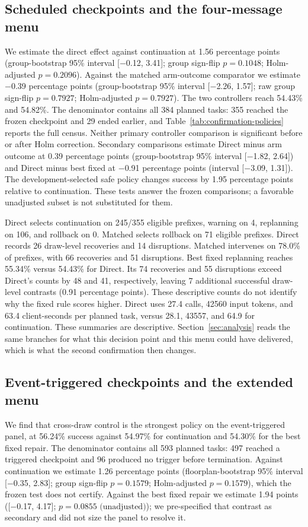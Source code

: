 \subsection{Scheduled checkpoints and the four-message menu}
We estimate the direct effect against continuation at 1.56 percentage points (group-bootstrap 95\% interval [$-$0.12, 3.41]; group sign-flip $p=0.1048$; Holm-adjusted $p=0.2096$). Against the matched arm-outcome comparator we estimate $-$0.39 percentage points (group-bootstrap 95\% interval [$-$2.26, 1.57]; raw group sign-flip $p=0.7927$; Holm-adjusted $p=0.7927$). The two controllers reach 54.43\% and 54.82\%. The denominator contains all 384 planned tasks: 355 reached the frozen checkpoint and 29 ended earlier, and Table~\ref{tab:confirmation-policies} reports the full census. Neither primary controller comparison is significant before or after Holm correction. Secondary comparisons estimate Direct minus arm outcome at 0.39 percentage points (group-bootstrap 95\% interval [$-$1.82, 2.64]) and Direct minus best fixed at $-$0.91 percentage points (interval [$-$3.09, 1.31]). The development-selected safe policy changes success by 1.95 percentage points relative to continuation. These tests answer the frozen comparisons; a favorable unadjusted subset is not substituted for them.

Direct selects continuation on 245/355 eligible prefixes, warning on 4, replanning on 106, and rollback on 0. Matched selects rollback on 71 eligible prefixes. Direct records 26 draw-level recoveries and 14 disruptions. Matched intervenes on 78.0\% of prefixes, with 66 recoveries and 51 disruptions. Best fixed replanning reaches 55.34\% versus 54.43\% for Direct. Its 74 recoveries and 55 disruptions exceed Direct's counts by 48 and 41, respectively, leaving 7 additional successful draw-level contrasts (0.91 percentage points). These descriptive counts do not identify why the fixed rule scores higher. Direct uses 27.4 calls, 42560 input tokens, and 63.4 client-seconds per planned task, versus 28.1, 43557, and 64.9 for continuation. These summaries are descriptive. Section~\ref{sec:analysis} reads the same branches for what this decision point and this menu could have delivered, which is what the second confirmation then changes.



\subsection{Event-triggered checkpoints and the extended menu}
\label{sec:results-r2}
We find that cross-draw control is the strongest policy on the event-triggered panel, at 56.24\% success against 54.97\% for continuation and 54.30\% for the best fixed repair. The denominator contains all 593 planned tasks: 497 reached a triggered checkpoint and 96 produced no trigger before termination. Against continuation we estimate 1.26 percentage points (floorplan-bootstrap 95\% interval [$-$0.35, 2.83]; group sign-flip $p=0.1579$; Holm-adjusted $p=0.1579$), which the frozen test does not certify. Against the best fixed repair we estimate 1.94 points ([$-$0.17, 4.17]; $p=0.0855\text{ (unadjusted)}$); we pre-specified that contrast as secondary and did not size the panel to resolve it.

